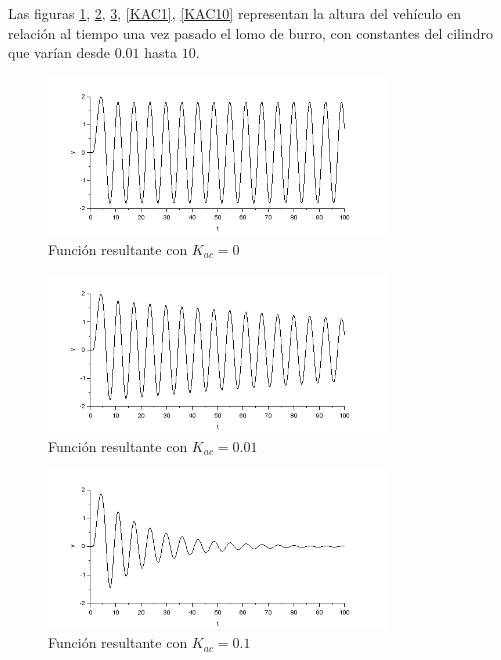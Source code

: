 \documentclass[12pt]{article}
\begin{document}
Las figuras \ref{KAC0}, \ref{KAC001}, \ref{KAC01}, \ref{KAC1}, \ref{KAC10} representan la altura del vehículo en relación al tiempo una vez pasado el lomo de burro, con constantes del cilindro que varían desde $0.01$ hasta $10$.

\begin{figure}[h!]
\center
\includegraphics[width=0.8\textwidth]{amortiguador_0.PNG}
\caption{Función resultante con $K_{ac}=0$}
\label{KAC0}
\end{figure}

\begin{figure}[h!]
\center
\includegraphics[width=0.8\textwidth]{amortiguador_001.PNG}
\caption{Función resultante con $K_{ac}=0.01$}
\label{KAC001}
\end{figure}

\begin{figure}[h!]
\center
\includegraphics[width=0.8\textwidth]{amortiguador_01.PNG}
\caption{Función resultante con $K_{ac}=0.1$}
\label{KAC01}
\end{figure}
\end{document}

